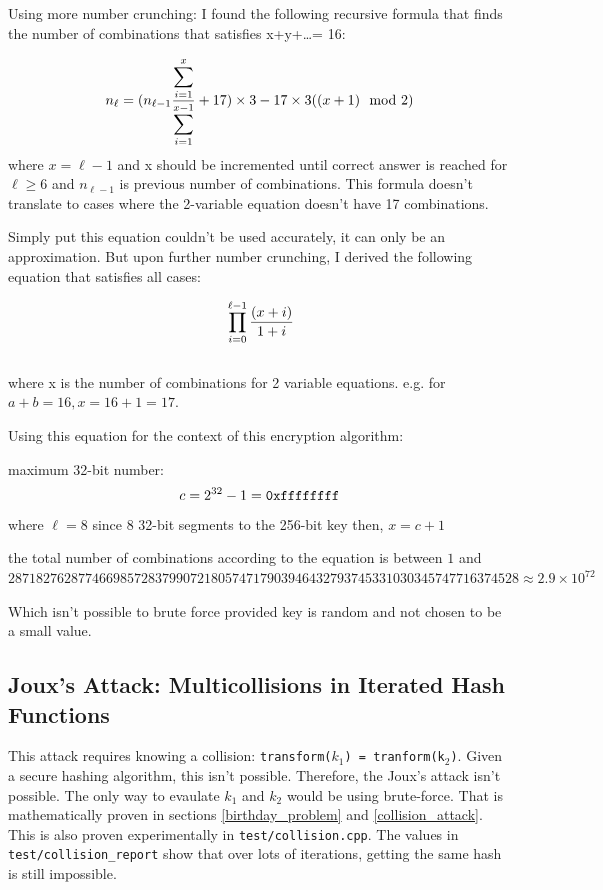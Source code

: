 \documentclass[fleqn, a4paper,12pt]{article}
\begin{document}
Using more number crunching: I found the following recursive formula that finds the number of combinations that satisfies x+y+\dots = 16:

\[
		\\ n_\ell = (n_{\ell-1} \frac{\displaystyle \sum_{i=1}^{x}}{\displaystyle \sum_{i=1}^{x-1}} +17) \times 3 - 17 \times 3( (x+1) \mod 2 )
\]
where $x = \ell-1$ \quad and x should be incremented until correct answer is reached for $\ell \geq 6$ and $n_{\ell-1}$ is previous number of combinations.
This formula doesn't translate to cases where the 2-variable equation doesn't have 17 combinations.

Simply put this equation couldn't be used accurately, it can only be an approximation. But upon further number crunching, I derived the following equation that satisfies all cases:

\[
\\ \prod_{i=0}^{\ell-1} \frac{(x+i)}{1+i}
\]
\\
where x is the number of combinations for 2 variable equations. e.g. for $a+b = 16, x = 16+1 = 17$.

Using this equation for the context of this encryption algorithm:

maximum 32-bit number:
\[
\\ c = 2^{32}-1 = \texttt{0xffffffff}
\]
where $\ell=8$ since 8 32-bit segments to the 256-bit key
then, $x = c + 1$

the total number of combinations according to the equation is between $1$ and \\$2871827628774669857283799072180574717903946432793745331030345747716374528 \approx 2.9 \times 10^{72}$

Which isn't possible to brute force provided key is random and not chosen to be a small value.

\subsection{Joux's Attack: Multicollisions in Iterated Hash Functions}


This attack requires knowing a collision: \texttt{transform($k_1$) = tranform(k$_2$)}. Given a secure hashing algorithm, this isn't possible. Therefore, the Joux's attack isn't possible. The only way to evaulate $k_1$ and $k_2$ would be using brute-force. That is mathematically proven in sections \ref{birthday_problem} and \ref{collision_attack}. This is also proven experimentally in \texttt{test/collision.cpp}. The values in \texttt{test/collision\_report} show that over lots of iterations, getting the same hash is still impossible.
\end{document}
